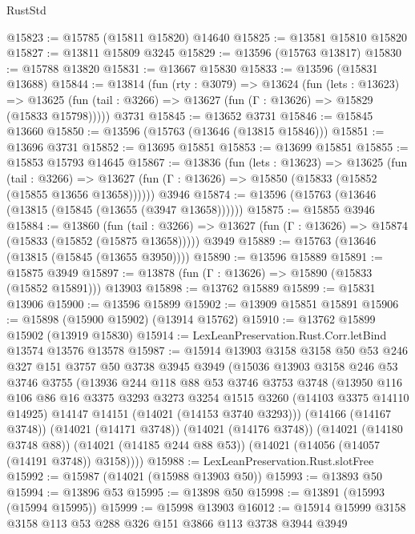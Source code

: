 \begin{lexlean}{RustStd}
\begin{coremodule}
{\begin{coremodule}
{{{{{{{{{{{{{{{{{{{{{{{{{{{{{{{{{{{{{{{@15823 := @15785 (@15811 @15820) @14640
@15825 := @13581 @15810 @15820
@15827 := @13811 @15809 @3245
@15829 := @13596 (@15763 @13817)
@15830 := @15788 @13820
@15831 := @13667 @15830
@15833 := @13596 (@15831 @13688)
@15844 := @13814
    (fun (rty : @3079) =>
    @13624
      (fun (lets : @13623) =>
      @13625 (fun (tail : @3266) => @13627 (fun (Γ : @13626) => @15829 (@15833 @15798)))))
    @3731
@15845 := @13652 @3731
@15846 := @15845 @13660
@15850 := @13596 (@15763 (@13646 (@13815 @15846)))
@15851 := @13696 @3731
@15852 := @13695 @15851
@15853 := @13699 @15851
@15855 := @15853 @15793 @14645
@15867 := @13836
    (fun (lets : @13623) =>
    @13625
      (fun (tail : @3266) =>
      @13627 (fun (Γ : @13626) => @15850 (@15833 (@15852 (@15855 @13656 @13658))))))
    @3946
@15874 := @13596 (@15763 (@13646 (@13815 (@15845 (@13655 (@3947 @13658))))))
@15875 := @15855 @3946
@15884 := @13860
    (fun (tail : @3266) => @13627 (fun (Γ : @13626) => @15874 (@15833 (@15852 (@15875 @13658)))))
    @3949
@15889 := @15763 (@13646 (@13815 (@15845 (@13655 @3950))))
@15890 := @13596 @15889
@15891 := @15875 @3949
@15897 := @13878 (fun (Γ : @13626) => @15890 (@15833 (@15852 @15891))) @13903
@15898 := @13762 @15889
@15899 := @15831 @13906
@15900 := @13596 @15899
@15902 := @13909 @15851 @15891
@15906 := @15898 (@15900 @15902) (@13914 @15762)
@15910 := @13762 @15899 @15902 (@13919 @15830)
@15914 := LexLeanPreservation.Rust.Corr.letBind @13574 @13576 @13578
@15987 := @15914
    @13903
    @3158
    @3158
    @50
    @53
    @246
    @327
    @151
    @3757
    @50
    @3738
    @3945
    @3949
    (@15036
      @13903
      @3158
      @246
      @53
      @3746
      @3755
      (@13936
        @244
        @118
        @88
        @53
        @3746
        @3753
        @3748
        (@13950
          @116
          @106
          @86
          @16
          @3375
          @3293
          @3273
          @3254
          @1515
          @3260
          (@14103 @3375 @14110 @14925)
          @14147
          @14151
          (@14021 (@14153 @3740 @3293)))
        (@14166 (@14167 @3748))
        (@14021 (@14171 @3748))
        (@14021 (@14176 @3748))
        (@14021 (@14180 @3748 @88))
        (@14021 (@14185 @244 @88 @53))
        (@14021 (@14056 (@14057 (@14191 @3748)) @3158))))
@15988 := LexLeanPreservation.Rust.slotFree
@15992 := @15987 (@14021 (@15988 @13903 @50))
@15993 := @13893 @50
@15994 := @13896 @53
@15995 := @13898 @50
@15998 := @13891 (@15993 (@15994 @15995))
@15999 := @15998 @13903
@16012 := @15914 @15999 @3158 @3158 @113 @53 @288 @326 @151 @3866 @113 @3738 @3944 @3949
}}}}}}}}}}}}}}}}}}}}}}}}}}}}}}}}}}}}}}}
\end{coremodule}}
\end{coremodule}
\end{lexlean}
